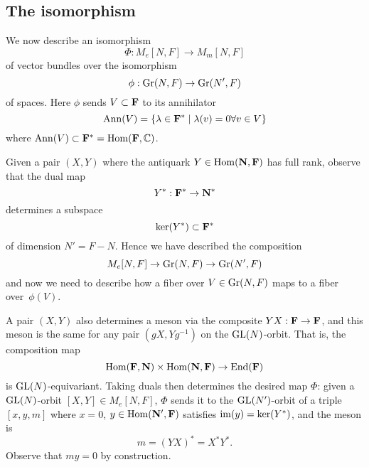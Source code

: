 \documentclass[11pt]{amsart}
\begin{document}
\subsection{The isomorphism}

We now describe an isomorphism
\[
\Phi: M_e[N,F] \to M_m[N,F]
\]
of vector bundles over the isomorphism
\[
\phi: {\rm Gr}(N,F) \to {\rm Gr}(N',F)
\]
of spaces.
Here $\phi$ sends $V \subset \mathbf F$ to its annihilator
\[
\operatorname{Ann}(V) = \{ \lambda \in \mathbf F^* \mid \lambda(v) = 0 \forall v \in V\}
\]
where $\operatorname{Ann}(V) \subset \mathbf F^* = {\rm Hom}(\mathbf F,\mathbb C)$.

Given a pair $(X, Y)$ where the antiquark $Y \in {\rm Hom}(\mathbf N,\mathbf F)$ has full rank,
observe that the dual map
\[
Y^*: \mathbf F^* \to \mathbf N^*
\]
determines a subspace
\[
\ker(Y^*) \subset \mathbf F^*
\]
of dimension $N' = F-N$.
Hence we have described the composition
\[
M_e[N,F] \to {\rm Gr}(N,F) \to {\rm Gr}(N',F)
\]
and now we need to describe how a fiber over $V \in {\rm Gr}(N,F)$ maps to a fiber over~$\phi(V)$.

A pair $(X,Y)$ also determines a meson via the composite $YX: \mathbf F \to \mathbf F$,
and this meson is the same for any pair $(gX, Yg^{-1})$ on the $\operatorname{GL}(N)$-orbit.
That is, the composition map
\[
{\rm Hom}(\mathbf F, \mathbf N) \times {\rm Hom}(\mathbf N,\mathbf F) \to {\rm End}(\mathbf F)
\]
is $\operatorname{GL}(N)$-equivariant.
Taking duals then determines the desired map $\Phi$:
given a $\operatorname{GL}(N)$-orbit $[X,Y] \in M_e[N,F]$,
$\Phi$ sends it to the $\operatorname{GL}(N')$-orbit of a triple $[x,y,m]$ where $x = 0$, $y \in {\rm Hom}(\mathbf N',\mathbf F)$ satisfies $\operatorname{im}(y) = \ker(Y^*)$, and the meson is
\[
m = (YX)^* = X^* Y^*.
\]
Observe that $my = 0$ by construction.

\end{document}
